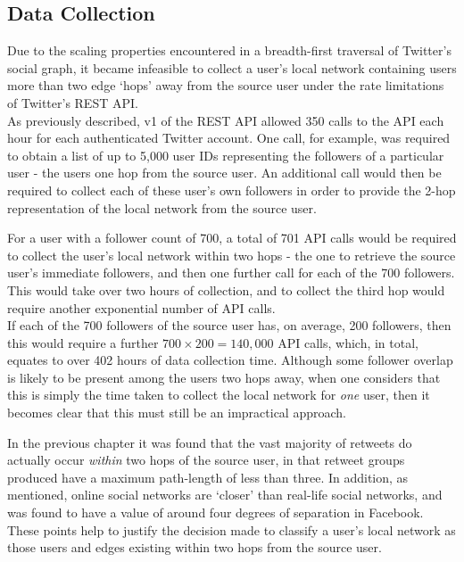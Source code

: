 \subsection{Data Collection}
Due to the scaling properties encountered in a breadth-first traversal of Twitter's social graph, it became infeasible to collect a user's local network containing users more than two edge `hops' away from the source user under the rate limitations of Twitter's REST API.\\
As previously described, v1 of the REST API allowed 350 calls to the API each hour for each authenticated Twitter account. One call, for example, was required to obtain a list of up to 5,000 user IDs representing the followers of a particular user - the users one hop from the source user. An additional call would then be required to collect each of these user's own followers in order to provide the 2-hop representation of the local network from the source user.

For a user with a follower count of 700, a total of 701 API calls would be required to collect the user's local network within two hops - the one to retrieve the source user's immediate followers, and then one further call for each of the 700 followers. This would take over two hours of collection, and to collect the third hop would require another exponential number of API calls.\\
If each of the 700 followers of the source user has, on average, 200 followers, then this would require  a further $700 \times 200 = 140,000$ API calls, which, in total, equates to over 402 hours of data collection time. Although some follower overlap is likely to be present among the users two hops away, when one considers that this is simply the time taken to collect the local network for \textit{one} user, then it becomes clear that this must still be an impractical approach.

In the previous chapter it was found that the vast majority of retweets do actually occur \textit{within} two hops of the source user, in that retweet groups produced have a maximum path-length of less than three. In addition, as mentioned, online social networks are `closer' than real-life social networks, and was found to have a value of around four degrees of separation in Facebook. These points help to justify the decision made to classify a user's local network as those users and edges existing within two hops from the source user.

